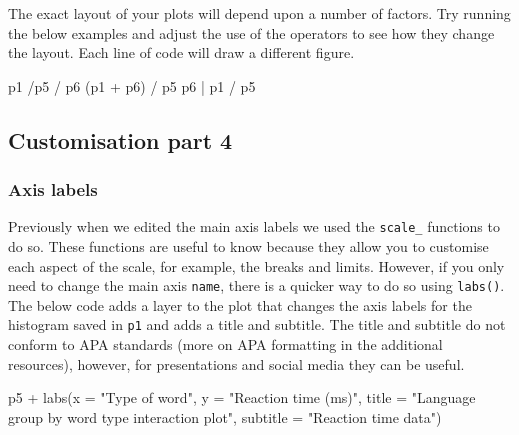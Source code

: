 \documentclass[
  english,
  doc,floatsintext]{apa6}
\newenvironment{Shaded}{\begin{snugshade}}{\end{snugshade}}
\newcommand{\AttributeTok}[1]{\textcolor[rgb]{0.77,0.63,0.00}{#1}}
\newcommand{\FunctionTok}[1]{\textcolor[rgb]{0.00,0.00,0.00}{#1}}
\newcommand{\NormalTok}[1]{#1}
\newcommand{\SpecialCharTok}[1]{\textcolor[rgb]{0.00,0.00,0.00}{#1}}
\newcommand{\StringTok}[1]{\textcolor[rgb]{0.31,0.60,0.02}{#1}}
\begin{document}
The exact layout of your plots will depend upon a number of factors. Try running the below examples and adjust the use of the operators to see how they change the layout. Each line of code will draw a different figure.

\begin{Shaded}
\begin{Highlighting}[]
\NormalTok{p1 }\SpecialCharTok{/}\NormalTok{p5 }\SpecialCharTok{/}\NormalTok{ p6 }
\NormalTok{(p1 }\SpecialCharTok{+}\NormalTok{ p6) }\SpecialCharTok{/}\NormalTok{ p5 }
\NormalTok{p6 }\SpecialCharTok{|}\NormalTok{ p1 }\SpecialCharTok{/}\NormalTok{ p5 }
\end{Highlighting}
\end{Shaded}

\hypertarget{customisation-part-4}{%
\subsection{Customisation part 4}\label{customisation-part-4}}

\hypertarget{axis-labels}{%
\subsubsection{Axis labels}\label{axis-labels}}

Previously when we edited the main axis labels we used the \texttt{scale\_} functions to do so. These functions are useful to know because they allow you to customise each aspect of the scale, for example, the breaks and limits. However, if you only need to change the main axis \texttt{name}, there is a quicker way to do so using \texttt{labs()}. The below code adds a layer to the plot that changes the axis labels for the histogram saved in \texttt{p1} and adds a title and subtitle. The title and subtitle do not conform to APA standards (more on APA formatting in the additional resources), however, for presentations and social media they can be useful.

\begin{Shaded}
\begin{Highlighting}[]
\NormalTok{p5 }\SpecialCharTok{+} \FunctionTok{labs}\NormalTok{(}\AttributeTok{x =} \StringTok{"Type of word"}\NormalTok{,}
          \AttributeTok{y =} \StringTok{"Reaction time (ms)"}\NormalTok{,}
          \AttributeTok{title =} \StringTok{"Language group by word type interaction plot"}\NormalTok{,}
          \AttributeTok{subtitle =} \StringTok{"Reaction time data"}\NormalTok{)}
\end{Highlighting}
\end{Shaded}
\end{document}
